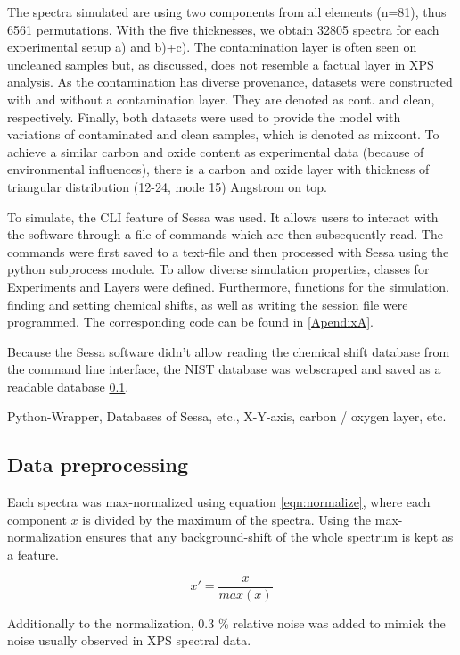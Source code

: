 The spectra simulated are using two components from all elements (n=81), thus 6561 permutations. With the five thicknesses, we obtain 32805 spectra for each experimental setup a) and b)+c).
The contamination layer is often seen on uncleaned samples but, as discussed, does not resemble a factual layer in XPS analysis. As the contamination has diverse provenance, datasets were constructed with and without a contamination layer. They are denoted as cont. and clean, respectively. Finally, both datasets were used to provide the model with variations of contaminated and clean samples, which is denoted as mixcont. 
To achieve a similar carbon and oxide content as experimental data (because of environmental influences), there is a carbon and oxide layer with thickness of triangular distribution (12-24, mode 15) Angstrom on top. 

To simulate, the CLI feature of Sessa was used. It allows users to interact with the software through a file of commands which are then subsequently read. The commands were first saved to a text-file and then processed with Sessa using the python subprocess module. To allow diverse simulation properties, classes for Experiments and Layers were defined. Furthermore, functions for the simulation, finding and setting chemical shifts, as well as writing the session file were programmed. The corresponding code can be found in \ref{ApendixA}.

Because the Sessa software didn't allow reading the chemical shift database from the command line interface, the NIST database was webscraped and saved as a readable database \ref{}.  

Python-Wrapper, Databases of Sessa, etc., X-Y-axis, carbon / oxygen layer, etc.


\subsection{Data preprocessing}

Each spectra was max-normalized using equation \ref{eqn:normalize}, where each component $x$ is divided by the maximum of the spectra. Using the max-normalization ensures that any background-shift of the whole spectrum is kept as a feature.

\begin{equation}
    x' = \frac{x}{max(x)}
\label{eqn:normalize}
\end{equation}

Additionally to the normalization, 0.3 \% relative noise was added to mimick the noise usually observed in XPS spectral data.

